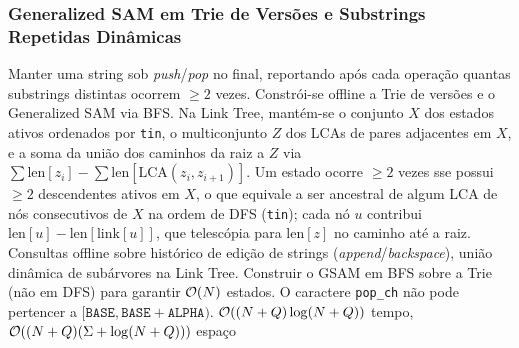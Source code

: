 \subsubsection{Generalized SAM em Trie de Versões e Substrings Repetidas Dinâmicas}
\algobox
  {Manter uma string sob \emph{push}/\emph{pop} no final, reportando após cada operação quantas substrings distintas ocorrem $\ge 2$ vezes.}
  {Constrói-se offline a Trie de versões e o Generalized SAM via BFS. Na Link Tree, mantém-se o conjunto $X$ dos estados ativos ordenados por \texttt{tin}, o multiconjunto $Z$ dos LCAs de pares adjacentes em $X$, e a soma da união dos caminhos da raiz a $Z$ via $\sum \text{len}[z_i] - \sum \text{len}[\text{LCA}(z_i, z_{i+1})]$.}
  {Um estado ocorre $\ge 2$ vezes sse possui $\ge 2$ descendentes ativos em $X$, o que equivale a ser ancestral de algum LCA de nós consecutivos de $X$ na ordem de DFS (\texttt{tin}); cada nó $u$ contribui $\text{len}[u] - \text{len}[\text{link}[u]]$, que telescópia para $\text{len}[z]$ no caminho até a raiz.}
  {Consultas offline sobre histórico de edição de strings (\emph{append}/\emph{backspace}), união dinâmica de subárvores na Link Tree.}
  {Construir o GSAM em BFS sobre a Trie (não em DFS) para garantir $\mathcal{O}(N)$ estados. O caractere \texttt{pop\_ch} não pode pertencer a $[\texttt{BASE}, \texttt{BASE}+\texttt{ALPHA})$.}
  {$\mathcal{O}((N + Q) \log(N + Q))$ tempo, $\mathcal{O}((N + Q)(\Sigma + \log(N + Q)))$ espaço}

